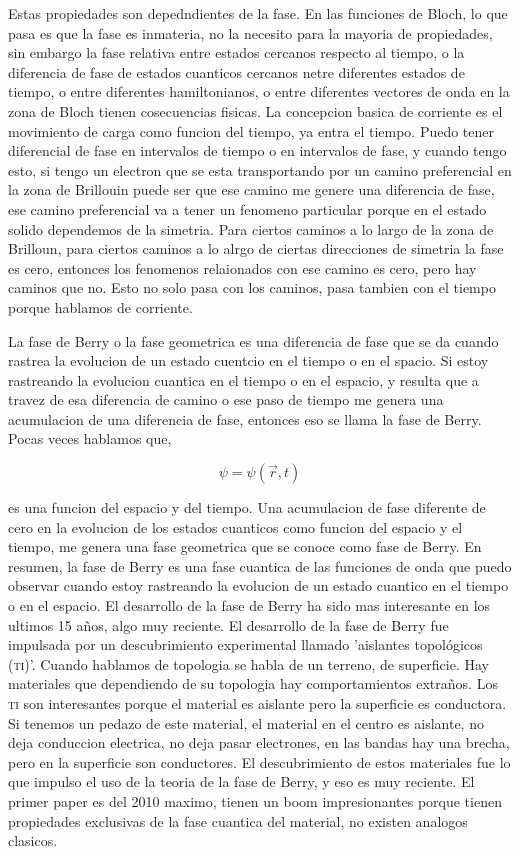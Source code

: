 \documentclass[11pt,fleqn]{book}
\begin{document}
Estas propiedades son depedndientes de la fase. En las funciones de Bloch, lo que pasa es que la fase es inmateria, no la necesito para la mayoria de propiedades, sin embargo la fase relativa entre estados cercanos respecto al tiempo, o la diferencia de fase de estados cuanticos cercanos netre diferentes estados de tiempo, o entre diferentes hamiltonianos, o entre diferentes vectores de onda en la zona de Bloch tienen cosecuencias fisicas. La concepcion basica de corriente es el movimiento de carga como funcion del tiempo, ya entra el tiempo. Puedo tener diferencial de fase en intervalos de tiempo o  en intervalos de fase, y cuando tengo esto, si tengo un electron que se esta transportando por un camino preferencial en la zona de Brillouin puede ser que ese camino me genere una diferencia de fase, ese camino preferencial va a tener un fenomeno particular porque en el estado solido dependemos de la simetria. Para ciertos caminos a lo largo de la zona de Brilloun, para ciertos caminos a lo alrgo de ciertas direcciones de simetria la fase es cero, entonces los fenomenos relaionados con ese camino es cero, pero hay caminos que no. Esto no solo pasa con los caminos, pasa tambien con el tiempo porque hablamos de corriente.

La fase de Berry o la fase geometrica es una diferencia de fase que se da cuando rastrea la evolucion de un estado cuentcio en el tiempo o en el spacio. Si estoy rastreando la evolucion cuantica en el tiempo o en el espacio, y resulta que a travez de esa diferencia de camino o ese paso de tiempo me genera una acumulacion de una diferencia de fase, entonces eso se llama la fase de Berry. Pocas veces hablamos que,

\begin{equation}
    \psi=\psi(\vec{r},t)
\end{equation}

es una funcion del espacio y del tiempo. Una acumulacion de fase diferente de cero en la evolucion de los estados cuanticos como funcion del espacio y el tiempo, me genera una fase geometrica que se conoce como fase de Berry. En resumen, la fase de Berry es una fase cuantica de las funciones de onda que puedo observar cuando estoy rastreando la evolucion de un estado cuantico en el tiempo o en el espacio. El desarrollo de la fase de Berry ha sido mas interesante en los ultimos 15 años, algo muy reciente. El desarrollo de la fase de Berry fue impulsada por un descubrimiento experimental llamado 'aislantes topológicos (\textsc{ti})'. Cuando hablamos de topologia se habla de un terreno, de superficie. Hay materiales que dependiendo de su topologia hay comportamientos extraños. Los \textsc{ti} son interesantes porque el material es aislante pero la superficie es conductora. Si tenemos un pedazo de este material, el material en el centro es aislante, no deja conduccion electrica, no deja pasar electrones, en las bandas hay una brecha, pero en la superficie son conductores. El descubrimiento de estos materiales fue lo que impulso el uso de la teoria de la fase de Berry, y eso es muy reciente. El primer paper es del 2010 maximo, tienen un boom impresionantes porque tienen propiedades exclusivas de la fase cuantica del material, no existen analogos clasicos.  
\end{document}
